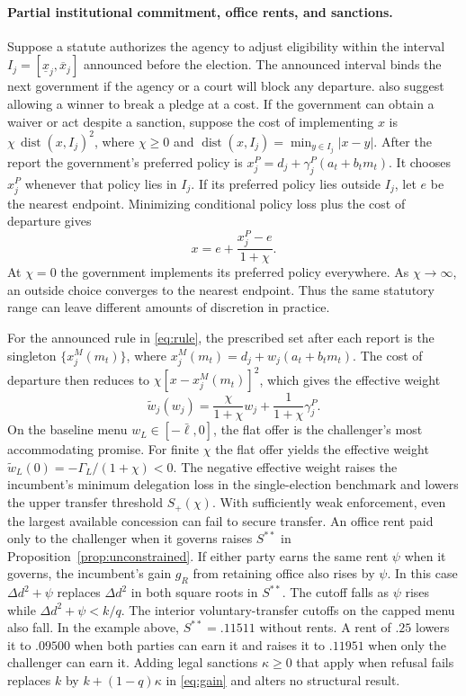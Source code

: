 \documentclass[11pt,letterpaper]{article}
\newcommand{\Dd}{\Delta d}
\begin{document}
\paragraph{Partial institutional commitment, office rents, and sanctions.}
Suppose a statute authorizes the agency to adjust eligibility within the interval $I_j=[\underline x_j,\overline x_j]$ announced before the election. The announced interval binds the next government if the agency or a court will block any departure. \citet{kartikvw} also suggest allowing a winner to break a pledge at a cost. If the government can obtain a waiver or act despite a sanction, suppose the cost of implementing $x$ is $\chi\,\operatorname{dist}(x,I_j)^2$, where $\chi\ge 0$ and $\operatorname{dist}(x,I_j)=\min_{y\in I_j}|x-y|$. After the report the government's preferred policy is $x_j^P=d_j+\gamma_j^P(a_t+b_t m_t)$. It chooses $x_j^P$ whenever that policy lies in $I_j$. If its preferred policy lies outside $I_j$, let $e$ be the nearest endpoint. Minimizing conditional policy loss plus the cost of departure gives
\[
 x=e+\frac{x_j^P-e}{1+\chi}.
\]
At $\chi=0$ the government implements its preferred policy everywhere. As $\chi\to\infty$, an outside choice converges to the nearest endpoint. Thus the same statutory range can leave different amounts of discretion in practice.

For the announced rule in \eqref{eq:rule}, the prescribed set after each report is the singleton $\{x_j^M(m_t)\}$, where $x_j^M(m_t)=d_j+w_j(a_t+b_t m_t)$. The cost of departure then reduces to $\chi[x-x_j^M(m_t)]^2$, which gives the effective weight
\begin{equation}
 \tilde w_j(w_j)=\frac{\chi}{1+\chi}w_j+\frac{1}{1+\chi}\gamma_j^P .
 \label{eq:partial}
\end{equation}
On the baseline menu $w_L\in[-\bar\ell,0]$, the flat offer is the challenger's most accommodating promise. For finite $\chi$ the flat offer yields the effective weight $\tilde w_L(0)=-\Gamma_L/(1+\chi)<0$. The negative effective weight raises the incumbent's minimum delegation loss in the single-election benchmark and lowers the upper transfer threshold $S_+(\chi)$. With sufficiently weak enforcement, even the largest available concession can fail to secure transfer. An office rent paid only to the challenger when it governs raises $S^{**}$ in Proposition~\ref{prop:unconstrained}. If either party earns the same rent $\psi$ when it governs, the incumbent's gain $g_R$ from retaining office also rises by $\psi$. In this case $\Dd^2+\psi$ replaces $\Dd^2$ in both square roots in $S^{**}$. The cutoff falls as $\psi$ rises while $\Dd^2+\psi<k/q$. The interior voluntary-transfer cutoffs on the capped menu also fall. In the example above, $S^{**}=.11511$ without rents. A rent of $.25$ lowers it to $.09500$ when both parties can earn it and raises it to $.11951$ when only the challenger can earn it. Adding legal sanctions $\kappa\ge 0$ that apply when refusal fails replaces $k$ by $k+(1-q)\kappa$ in \eqref{eq:gain} and alters no structural result.
\end{document}
